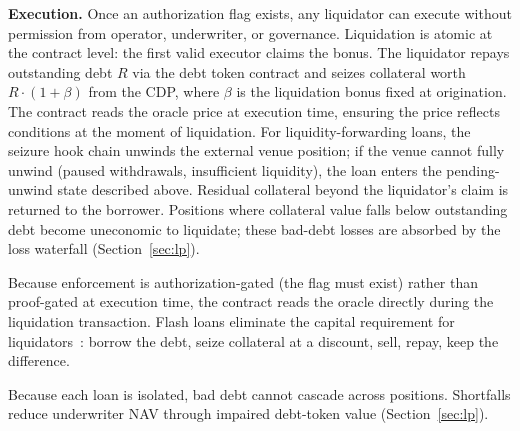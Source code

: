 \textbf{Execution.} Once an authorization flag exists, any liquidator can execute without permission from operator, underwriter, or governance. Liquidation is atomic at the contract level: the first valid executor claims the bonus. The liquidator repays outstanding debt $R$ via the debt token contract and seizes collateral worth $R \cdot (1 + \beta)$ from the CDP, where $\beta$ is the liquidation bonus fixed at origination. The contract reads the oracle price at execution time, ensuring the price reflects conditions at the moment of liquidation. For liquidity-forwarding loans, the seizure hook chain unwinds the external venue position; if the venue cannot fully unwind (paused withdrawals, insufficient liquidity), the loan enters the pending-unwind state described above. Residual collateral beyond the liquidator's claim is returned to the borrower. Positions where collateral value falls below outstanding debt become uneconomic to liquidate; these bad-debt losses are absorbed by the loss waterfall (Section~\ref{sec:lp}).

Because enforcement is authorization-gated (the flag must exist) rather than proof-gated at execution time, the contract reads the oracle directly during the liquidation transaction. Flash loans eliminate the capital requirement for liquidators~\cite{perez2021,qin2021}: borrow the debt, seize collateral at a discount, sell, repay, keep the difference.

Because each loan is isolated, bad debt cannot cascade across positions. Shortfalls reduce underwriter NAV through impaired debt-token value (Section~\ref{sec:lp}).

